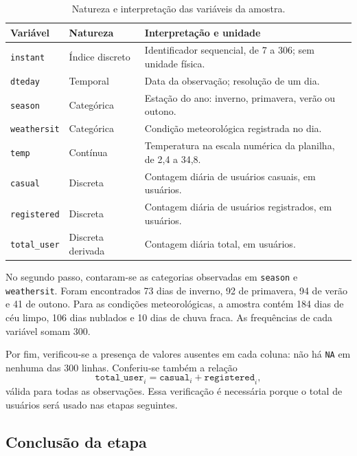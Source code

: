 \documentclass[12pt,a4paper]{article}
\renewcommand{\arraystretch}{1.2}
\begin{document}
\begin{table}[H]
\centering\footnotesize
\renewcommand{\arraystretch}{1.06}
\caption{Natureza e interpretação das variáveis da amostra.}
\begin{tabular}{p{2.3cm}p{3.6cm}p{8.6cm}}
\toprule
Variável & Natureza & Interpretação e unidade \\
\midrule
\texttt{instant} & Índice discreto & Identificador sequencial, de 7 a 306; sem unidade física. \\
\texttt{dteday} & Temporal & Data da observação; resolução de um dia. \\
\texttt{season} & Categórica & Estação do ano: inverno, primavera, verão ou outono. \\
\texttt{weathersit} & Categórica & Condição meteorológica registrada no dia. \\
\texttt{temp} & Contínua & Temperatura na escala numérica da planilha, de 2,4 a 34,8. \\
\texttt{casual} & Discreta & Contagem diária de usuários casuais, em usuários. \\
\texttt{registered} & Discreta & Contagem diária de usuários registrados, em usuários. \\
\texttt{total\_user} & Discreta derivada & Contagem diária total, em usuários. \\
\bottomrule
\end{tabular}
\end{table}

No segundo passo, contaram-se as categorias observadas em
\texttt{season} e \texttt{weathersit}. Foram encontrados 73 dias de inverno,
92 de primavera, 94 de verão e 41 de outono. Para as condições
meteorológicas, a amostra contém 184 dias de céu limpo, 106 dias nublados e
10 dias de chuva fraca. As frequências de cada variável somam 300.

Por fim, verificou-se a presença de valores ausentes em cada coluna: não há
\texttt{NA} em nenhuma das 300 linhas. Conferiu-se também a relação
\begin{equation}
\texttt{total\_user}_i=\texttt{casual}_i+\texttt{registered}_i,
\end{equation}
válida para todas as observações. Essa verificação é necessária porque o
total de usuários será usado nas etapas seguintes.

\subsection{Conclusão da etapa}
\end{document}
